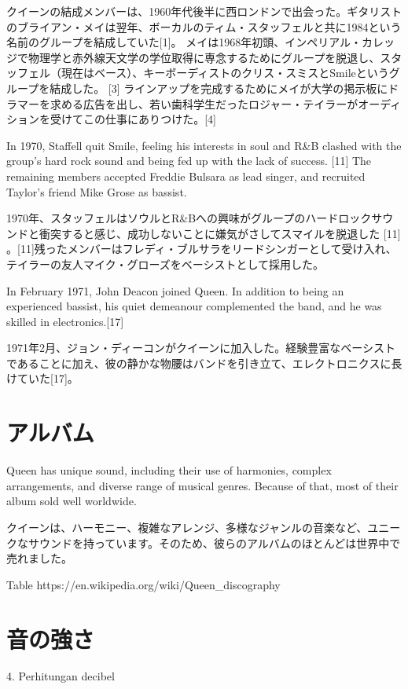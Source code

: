 \documentclass[a4j, twocolumn]{jarticle}
\begin{document}
クイーンの結成メンバーは、1960年代後半に西ロンドンで出会った。ギタリストのブライアン・メイは翌年、ボーカルのティム・スタッフェルと共に1984という名前のグループを結成していた[1]。 
メイは1968年初頭、インペリアル・カレッジで物理学と赤外線天文学の学位取得に専念するためにグループを脱退し、スタッフェル（現在はベース）、キーボーディストのクリス・スミスとSmileというグループを結成した。 [3] 
ラインアップを完成するためにメイが大学の掲示板にドラマーを求める広告を出し、若い歯科学生だったロジャー・テイラーがオーディションを受けてこの仕事にありつけた。[4]


In 1970, Staffell quit Smile, feeling his interests in soul and R&B clashed with the group's hard rock sound and being fed up with the lack of success. [11] The remaining members accepted Freddie Bulsara as lead singer, and recruited Taylor's friend Mike Grose as bassist.

1970年、スタッフェルはソウルとR&Bへの興味がグループのハードロックサウンドと衝突すると感じ、成功しないことに嫌気がさしてスマイルを脱退した [11] 。[11]残ったメンバーはフレディ・ブルサラをリードシンガーとして受け入れ、テイラーの友人マイク・グローズをベーシストとして採用した。

In February 1971, John Deacon joined Queen. In addition to being an experienced bassist, his quiet demeanour complemented the band, and he was skilled in electronics.[17]

1971年2月、ジョン・ディーコンがクイーンに加入した。経験豊富なベーシストであることに加え、彼の静かな物腰はバンドを引き立て、エレクトロニクスに長けていた[17]。


\section{アルバム}

Queen has unique sound, including their use of harmonies, complex arrangements, and diverse range of musical genres. Because of that, most of their album sold well worldwide.

クイーンは、ハーモニー、複雑なアレンジ、多様なジャンルの音楽など、ユニークなサウンドを持っています。そのため、彼らのアルバムのほとんどは世界中で売れました。

Table
https://en.wikipedia.org/wiki/Queen_discography


\section{音の強さ}
4. Perhitungan decibel
\end{document}
